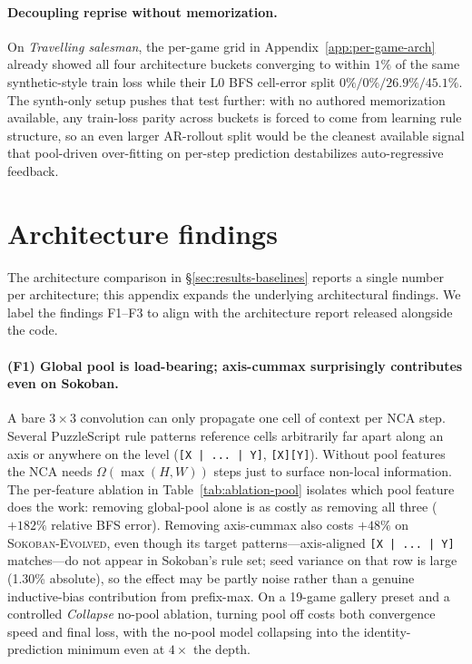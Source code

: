 \paragraph{Decoupling reprise without memorization.}
On \textit{Travelling salesman}, the per-game grid in
Appendix~\ref{app:per-game-arch} already showed all four
architecture buckets converging to within $1\%$ of the same
synthetic-style train loss while their L0 BFS cell-error split
$0\% / 0\% / 26.9\% / 45.1\%$. The synth-only setup pushes that
test further: with no authored memorization available, any
train-loss parity across buckets is forced to come from learning
rule structure, so an even larger AR-rollout split would be the
cleanest available signal that pool-driven over-fitting on per-step
prediction destabilizes auto-regressive feedback.

\section{Architecture findings}
\label{app:arch-findings}

The architecture comparison in \S\ref{sec:results-baselines} reports a
single number per architecture; this appendix expands the underlying
architectural findings. We label the findings F1--F3 to align with
the architecture report released alongside the code.

\paragraph{(F1) Global pool is load-bearing; axis-cummax surprisingly
contributes even on Sokoban.}
A bare $3{\times}3$ convolution can only propagate one cell of context
per NCA step.
Several PuzzleScript rule patterns reference cells arbitrarily far apart along an axis or anywhere on the level (\texttt{[X | ... | Y]}, \texttt{[X][Y]}).
Without pool features the NCA needs $\Omega(\max(H,W))$ steps just to surface non-local information.
The per-feature ablation in Table~\ref{tab:ablation-pool} isolates which pool feature does the work: removing global-pool alone is as costly as removing all three ($+182\%$ relative BFS error).
Removing axis-cummax also costs $+48\%$ on \textsc{Sokoban-Evolved}, even though its target patterns---axis-aligned \texttt{[X | ... | Y]} matches---do not appear in Sokoban's rule set; seed variance on that row is large (1.30\% absolute), so the effect may be partly noise rather than a genuine inductive-bias contribution from prefix-max.
On a 19-game gallery preset and a controlled \textit{Collapse} no-pool ablation, turning pool off costs both convergence speed and final loss, with the no-pool model collapsing into the identity-prediction minimum even at $4{\times}$ the depth.

